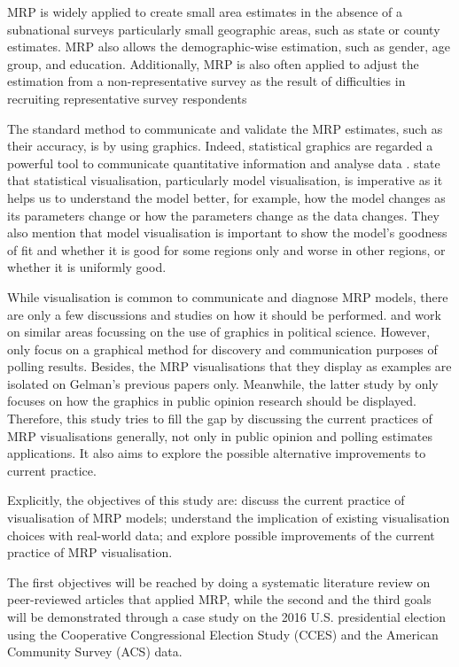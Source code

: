 \documentclass{monashthesis}
\begin{document}
MRP is widely applied to create small area estimates in the absence of a subnational surveys \autocite{hanretty} particularly small geographic areas, such as state or county estimates. MRP also allows the demographic-wise estimation, such as gender, age group, and education. Additionally, MRP is also often applied to adjust the estimation from a non-representative survey as the result of difficulties in recruiting representative survey respondents \autocite{GelmanAndrew2007SwSW}

The standard method to communicate and validate the MRP estimates, such as their accuracy, is by using graphics. Indeed, statistical graphics are regarded a powerful tool to communicate quantitative information and analyse data \autocite{ClevelandWilliamS,1983Gmfd}. \textcite{WickhamHadley2015VsmR} state that statistical visualisation, particularly model visualisation, is imperative as it helps us to understand the model better, for example, how the model changes as its parameters change or how the parameters change as the data changes. They also mention that model visualisation is important to show the model's goodness of fit and whether it is good for some regions only and worse in other regions, or whether it is uniformly good.

While visualisation is common to communicate and diagnose MRP models, there are only a few discussions and studies on how it should be performed. \textcite{mekelagelman} and \textcite{saundra} work on similar areas focussing on the use of graphics in political science. However, \textcite{mekelagelman} only focus on a graphical method for discovery and communication purposes of polling results. Besides, the MRP visualisations that they display as examples are isolated on Gelman's previous papers only. Meanwhile, the latter study by \textcite{saundra} only focuses on how the graphics in public opinion research should be displayed. Therefore, this study tries to fill the gap by discussing the current practices of MRP visualisations generally, not only in public opinion and polling estimates applications. It also aims to explore the possible alternative improvements to current practice.

Explicitly, the objectives of this study are: discuss the current practice of visualisation of MRP models; understand the implication of existing visualisation choices with real-world data; and explore possible improvements of the current practice of MRP visualisation.

The first objectives will be reached by doing a systematic literature review on peer-reviewed articles that applied MRP, while the second and the third goals will be demonstrated through a case study on the 2016 U.S. presidential election using the Cooperative Congressional Election Study (CCES) and the American Community Survey (ACS) data.
\end{document}
